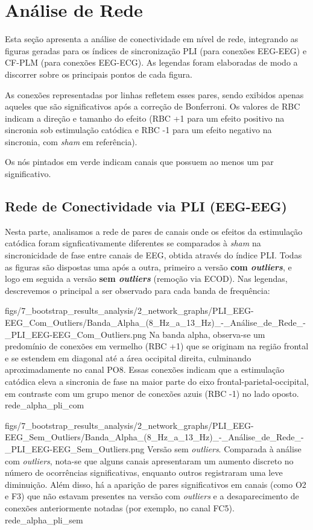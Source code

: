 \chapter{Análise de Rede}
\label{chap:analise_de_rede}
Esta seção apresenta a análise de conectividade em nível de rede, integrando as figuras geradas para os índices de sincronização PLI (para conexões EEG-EEG) e CF-PLM (para conexões EEG-ECG). As legendas foram elaboradas de modo a discorrer sobre os principais pontos de cada figura. 

As conexões representadas por linhas refletem esses pares, sendo exibidos apenas aqueles que são significativos após a correção de Bonferroni. Os valores de RBC indicam a direção e tamanho do efeito (RBC +1 para um efeito positivo na sincronia sob estimulação catódica e RBC -1 para um efeito negativo na sincronia, com \textit{sham} em referência).

Os nós pintados em verde indicam canais que possuem ao menos um par significativo.

\section{Rede de Conectividade via PLI (EEG-EEG)}
Nesta parte, analisamos a rede de pares de canais onde os efeitos da estimulação catódica foram signficativamente diferentes se comparados à \textit{sham} na sincronicidade de fase entre canais de EEG, obtida através do índice PLI. Todas as figuras são dispostas uma após a outra, primeiro a versão \textbf{com \textit{outliers}}, e logo em seguida a versão \textbf{sem \textit{outliers}} (remoção via ECOD). Nas legendas, descrevemos o principal a ser observado para cada banda de frequência:

\ultrawidefigure
{figs/7_bootstrap_results_analysis/2_network_graphs/PLI_EEG-EEG_Com_Outliers/Banda_Alpha_(8_Hz_a_13_Hz)_-_Análise_de_Rede_-_PLI_EEG-EEG_Com_Outliers.png}
{Na banda alpha, observa-se um predomínio de conexões em vermelho (RBC +1) que se originam na região frontal e se estendem em diagonal até a área occipital direita, culminando aproximadamente no canal PO8. Essas conexões indicam que a estimulação catódica eleva a sincronia de fase na maior parte do eixo frontal-parietal-occipital, em contraste com um grupo menor de conexões azuis (RBC -1) no lado oposto.}
{rede_alpha_pli_com}

\ultrawidefigure
{figs/7_bootstrap_results_analysis/2_network_graphs/PLI_EEG-EEG_Sem_Outliers/Banda_Alpha_(8_Hz_a_13_Hz)_-_Análise_de_Rede_-_PLI_EEG-EEG_Sem_Outliers.png}
{Versão sem \textit{outliers}. Comparada à análise com \textit{outliers}, nota-se que alguns canais apresentaram um aumento discreto no número de ocorrências significativas, enquanto outros registraram uma leve diminuição. Além disso, há a aparição de pares significativos em canais (como O2 e F3) que não estavam presentes na versão com \textit{outliers} e a desaparecimento de conexões anteriormente notadas (por exemplo, no canal FC5).}
{rede_alpha_pli_sem}

